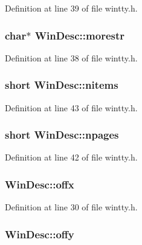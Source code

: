 Definition at line 39 of file wintty.\+h.

\hypertarget{structWinDesc_a803538ce4649c8df737affa75754f338}{
\subsubsection[{morestr}]{\setlength{\rightskip}{0pt plus 5cm}char$\ast$ Win\+Desc\+::morestr}}\label{structWinDesc_a803538ce4649c8df737affa75754f338}


Definition at line 38 of file wintty.\+h.

\hypertarget{structWinDesc_a09fe035f1e69ead30687caddadd49e18}{
\subsubsection[{nitems}]{\setlength{\rightskip}{0pt plus 5cm}short Win\+Desc\+::nitems}}\label{structWinDesc_a09fe035f1e69ead30687caddadd49e18}


Definition at line 43 of file wintty.\+h.

\hypertarget{structWinDesc_a164fab2f599c23ccb1e54d099b3b97bd}{
\subsubsection[{npages}]{\setlength{\rightskip}{0pt plus 5cm}short Win\+Desc\+::npages}}\label{structWinDesc_a164fab2f599c23ccb1e54d099b3b97bd}


Definition at line 42 of file wintty.\+h.

\hypertarget{structWinDesc_a36008e8c04406de92c311bce7b984134}{
\subsubsection[{offx}]{ Win\+Desc\+::offx}}\label{structWinDesc_a36008e8c04406de92c311bce7b984134}


Definition at line 30 of file wintty.\+h.

\hypertarget{structWinDesc_a93252f6a46614ef89276da2d7889df76}{
\subsubsection[{offy}]{ Win\+Desc\+::offy}}\label{structWinDesc_a93252f6a46614ef89276da2d7889df76}


